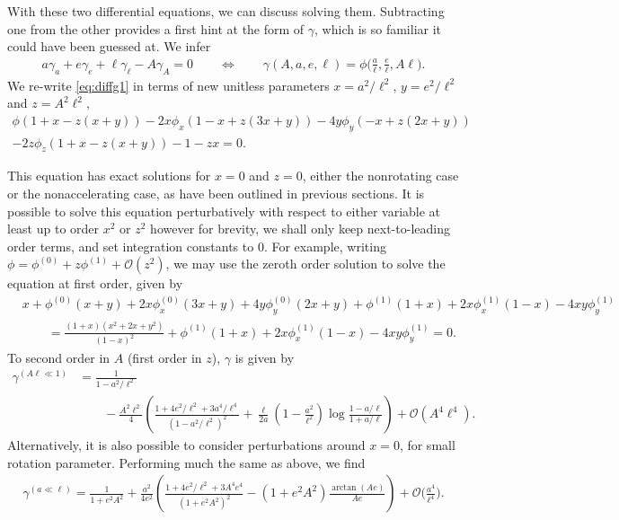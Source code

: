 \documentclass[
twoside,
openright,
frontopenright,
]{dmathesis}
\newcommand{\nn}{\nonumber}
\begin{document}
With these two differential equations, we can discuss solving them. Subtracting
one from the other provides a first hint at the form of $\gamma$, which is so
familiar it could have been guessed at. We infer 
\begin{align}
a\gamma_{a} + e\gamma_{e} + \ell\gamma_{\ell} - A \gamma_{A} = 0 \qquad \Longleftrightarrow \qquad \gamma(A,a,e,\ell) = \phi\Big(\frac{a}{\ell}, \frac{e}{\ell}, A\ell\Big).
\end{align}
We re-write \cref{eq:diffg1} in terms of new unitless parameters $x=
a^2/\ell^2$, $y=e^2/\ell^2$ and $z=A^2\ell^2$, 
\begin{multline}
\phi(1+x-z(x+y))-2x \phi_{x}(1-x+z(3x+y))-4y\phi_{y}(-x+z(2x+y))\\-2z\phi_{z}(1+x-z(x+y))-1-zx=0.
\end{multline}

This equation has exact solutions for $x=0$ and $z=0$, either the nonrotating
case or the nonaccelerating case, as have been outlined in previous
sections. It is possible to solve this equation perturbatively with respect to
either variable at least up to order $x^2$ or $z^2$ however for brevity, we
shall only keep next-to-leading order terms, and set integration constants to
$0$. For example, writing $\phi = \phi^{(0)}+z\phi^{(1)}+\mathcal{O}(z^2)$, we
may use the zeroth order solution to solve the equation at first order, given by
\begin{align}
&x+\phi^{(0)}(x+y)+2x\phi^{(0)}_{x}(3x+y)+4y\phi^{(0)}_{y}(2x+y)+\phi^{(1)}(1+x)+2x\phi^{(1)}_{x}(1-x)-4xy\phi^{(1)}_{y}\nn\\
&\qquad= \frac{(1+x)(x^2+2x+y^2)}{(1-x)^2}+\phi^{(1)}(1+x)+2x\phi^{(1)}_{x}(1-x)-4xy\phi^{(1)}_{y} = 0.
\end{align}
To second order in $A$ (first order in $z$), $\gamma$ is given by
\begin{align}
  \gamma^{(A\ell\ll 1)} &= \frac{1}{1-a^2/\ell^2}\nn\\
     &\qquad -\frac{A^2\ell^2}{4} \left(\frac{1+4e^2/\ell^2+3
       a^4/\ell^4}{\left(1-a^2/\ell^2\right)^2} +\frac{\ell}{2a}
       \left(1-\frac{a^2}{\ell^2}\right) \log\frac{1-a/\ell}{1+a/\ell}\right)
       +\mathcal{O}(A^4\ell^4). 
\label{eq:gamsmallA}
\end{align}
Alternatively, it is also possible to consider perturbations around $x=0$, for
small rotation parameter. Performing much the same as above, we find
\begin{align}\label{eq:gamsmalla}
\gamma^{(a\ll \ell)} = \frac{1}{1+e^2A^2}+\frac{a^2}{4e^2}\left(\frac{1+4e^2/\ell^2+3 A^4 e^4}{\left(1+e^2A^2\right)^2}-\left(1+e^2A^2\right) \frac{\arctan(A e)}{A e }\right)+\mathcal{O}\Big(\frac{a^4}{\ell^4}\Big).
\end{align}
\end{document}
